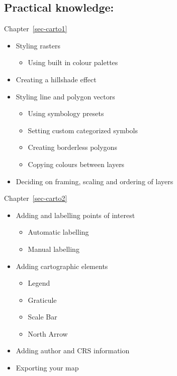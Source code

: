 \documentclass[
  letterpaper,
  DIV=11,
  numbers=noendperiod]{scrreprt}
\providecommand{\tightlist}{%
  \setlength{\itemsep}{0pt}\setlength{\parskip}{0pt}}\usepackage{longtable,booktabs,array}
\begin{document}
\subsection*{Practical knowledge:}\label{practical-knowledge-3}

Chapter~\ref{sec-carto1}

\begin{itemize}
\tightlist
\item
  Styling rasters

  \begin{itemize}
  \tightlist
  \item
    Using built in colour palettes
  \end{itemize}
\item
  Creating a hillshade effect
\item
  Styling line and polygon vectors

  \begin{itemize}
  \tightlist
  \item
    Using symbology presets
  \item
    Setting custom categorized symbols
  \item
    Creating borderless polygons
  \item
    Copying colours between layers
  \end{itemize}
\item
  Deciding on framing, scaling and ordering of layers
\end{itemize}

Chapter~\ref{sec-carto2}

\begin{itemize}
\tightlist
\item
  Adding and labelling points of interest

  \begin{itemize}
  \tightlist
  \item
    Automatic labelling
  \item
    Manual labelling
  \end{itemize}
\item
  Adding cartographic elements

  \begin{itemize}
  \tightlist
  \item
    Legend
  \item
    Graticule
  \item
    Scale Bar
  \item
    North Arrow
  \end{itemize}
\item
  Adding author and CRS information
\item
  Exporting your map
\end{itemize}
\end{document}
